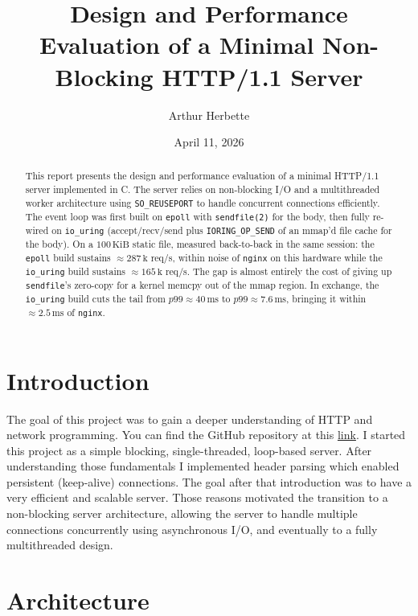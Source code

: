 \documentclass{article}
\title{Design and Performance Evaluation of a Minimal Non-Blocking HTTP/1.1 Server}
\author{Arthur Herbette}
\date{April 11, 2026}
\begin{document}
\maketitle

\begin{abstract}
This report presents the design and performance evaluation of a minimal HTTP/1.1 server implemented in C. The server relies on non-blocking I/O and a multithreaded worker architecture using \texttt{SO\_REUSEPORT} to handle concurrent connections efficiently. The event loop was first built on \texttt{epoll} with \texttt{sendfile(2)} for the body, then fully re-wired on \texttt{io\_uring} (accept/recv/send plus \texttt{IORING\_OP\_SEND} of an mmap'd file cache for the body). On a $100\,\mathrm{KiB}$ static file, measured back-to-back in the same session: the \texttt{epoll} build sustains $\approx 287\,\mathrm{k}$ req/s,  within noise of \texttt{nginx} on this hardware while the \texttt{io\_uring} build sustains $\approx 165\,\mathrm{k}$ req/s. The gap is almost entirely the cost of giving up \texttt{sendfile}'s zero-copy for a kernel memcpy out of the mmap region. In exchange, the \texttt{io\_uring} build cuts the tail from $p99 \approx 40\,\mathrm{ms}$ to $p99 \approx 7.6\,\mathrm{ms}$, bringing it within $\approx 2.5\,\mathrm{ms}$ of \texttt{nginx}.
\end{abstract}

\section{Introduction}

The goal of this project was to gain a deeper understanding of HTTP and network programming. You can find the GitHub repository at this \href{https://github.com/Arthur926564/syscall-web/tree/feature-io-uring}{link}. I started this project as a simple blocking, single-threaded, loop-based server. After understanding those fundamentals I implemented header parsing which enabled persistent (keep-alive) connections. The goal after that introduction was to have a very efficient and scalable server. Those reasons motivated the transition to a non-blocking server architecture, allowing the server to handle multiple connections concurrently using asynchronous I/O, and eventually to a fully multithreaded design.

\section{Architecture}
\end{document}
